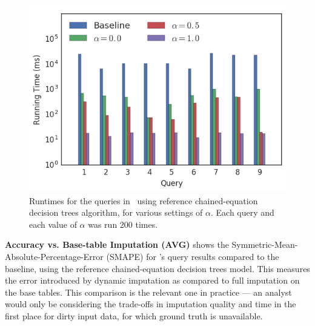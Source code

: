 {\begin{figure}
\includegraphics[width=\columnwidth]{figures/running_times_combined_bar.png}
\caption{Runtimes for the queries in~ using reference
    chained-equation decision trees algorithm, for various settings of $\alpha$.
    Each query and each value of $\alpha$ was run 200 times.}
\label{fig:runtimes}
\end{figure}




\textbf{Accuracy vs. Base-table Imputation (AVG)}\quad {} shows the Symmetric-Mean-Absolute-Percentage-Error (SMAPE) \cite{Makridakis2000451} for \ProjectName{}'s query results compared to the baseline, using the reference chained-equation decision trees model.
This measures the error introduced by dynamic imputation as compared to full imputation on the base tables.
This comparison is the relevant one in practice --- an analyst would only be considering the trade-offs in imputation quality and time in the first place for dirty input data, for which ground truth is unavailable.

}
